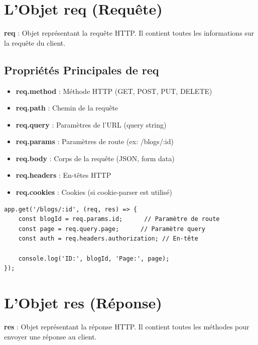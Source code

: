 \section{L'Objet req (Requête)}

\begin{definitionbox}
    \textbf{req} : Objet représentant la requête HTTP. Il contient toutes les informations sur la requête du client.
\end{definitionbox}

\subsection{Propriétés Principales de req}

\begin{itemize}
    \item \textbf{req.method} : Méthode HTTP (GET, POST, PUT, DELETE)
    \item \textbf{req.path} : Chemin de la requête
    \item \textbf{req.query} : Paramètres de l'URL (query string)
    \item \textbf{req.params} : Paramètres de route (ex: /blogs/:id)
    \item \textbf{req.body} : Corps de la requête (JSON, form data)
    \item \textbf{req.headers} : En-têtes HTTP
    \item \textbf{req.cookies} : Cookies (si cookie-parser est utilisé)
\end{itemize}

\begin{lstlisting}[style=javascript, caption=Exemple d'utilisation de req]
app.get('/blogs/:id', (req, res) => {
    const blogId = req.params.id;      // Paramètre de route
    const page = req.query.page;      // Paramètre query
    const auth = req.headers.authorization; // En-tête
    
    console.log('ID:', blogId, 'Page:', page);
});
\end{lstlisting}

\section{L'Objet res (Réponse)}

\begin{definitionbox}
    \textbf{res} : Objet représentant la réponse HTTP. Il contient toutes les méthodes pour envoyer une réponse au client.
\end{definitionbox}

